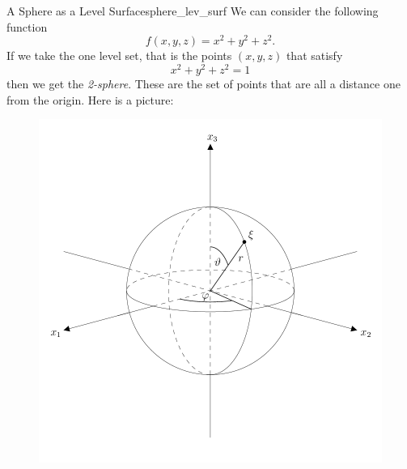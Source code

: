         \begin{ex}{A Sphere as a Level Surface}{sphere_lev_surf}
        We can consider the following function
        \[
        f(x,y,z)=x^2+y^2+z^2.
        \]
        If we take the one level set, that is the points $(x,y,z)$ that satisfy
        \[
        x^2+y^2+z^2=1
        \]
        then we get the \emph{2-sphere}.  These are the set of points that are all a distance one from the origin.  Here is a picture:
        \begin{figure}[H]
            \centering
            \includegraphics[width=.4\textwidth]{Figures/sphere.png}
        \end{figure}
        \end{ex}
        
